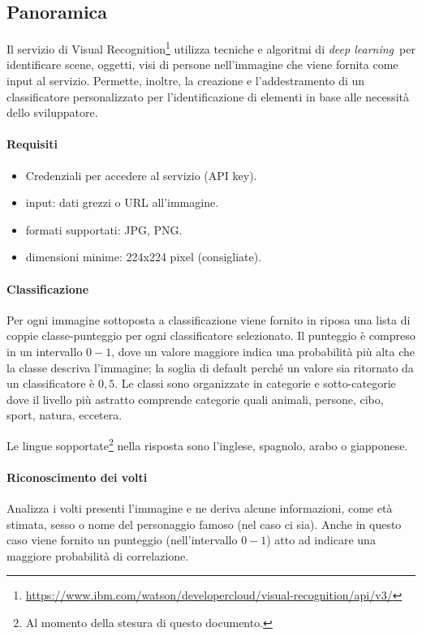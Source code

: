 \documentclass[fleqn,a4paper,11pt]{report}
\begin{document}
\subsection{Panoramica}
Il servizio di Visual Recognition\footnote{\url{https://www.ibm.com/watson/developercloud/visual-recognition/api/v3/}} utilizza tecniche e algoritmi di \textit{deep learning} per identificare scene, oggetti, visi di persone nell'immagine che viene fornita come input al servizio. Permette, inoltre, la creazione e l'addestramento di un classificatore personalizzato per l'identificazione di elementi in base alle necessità dello sviluppatore.

\paragraph{Requisiti}
\begin{itemize}
\item Credenziali per accedere al servizio (API key).
\item input: dati grezzi o URL all'immagine.
\item formati supportati: JPG, PNG.
\item dimensioni minime: 224x224 pixel (consigliate).
\end{itemize}

\paragraph{Classificazione} Per ogni immagine sottoposta a classificazione viene fornito in riposa una lista di coppie classe-punteggio per ogni classificatore selezionato. Il punteggio è compreso in un intervallo $0-1$, dove un valore maggiore indica una probabilità più alta che la classe descriva l'immagine; la soglia di default perché un valore sia ritornato da un classificatore è $0,5$.
Le classi sono organizzate in categorie e sotto-categorie dove il livello più astratto comprende categorie quali animali, persone, cibo, sport, natura, eccetera.

Le lingue sopportate\footnote{Al momento della stesura di questo documento.} nella risposta sono l'inglese, spagnolo, arabo o giapponese. 

\paragraph{Riconoscimento dei volti} Analizza i volti presenti l'immagine e ne deriva alcune informazioni, come età stimata, sesso o nome del personaggio famoso (nel caso ci sia). Anche in questo caso viene fornito un punteggio (nell'intervallo $0-1$) atto ad indicare una maggiore probabilità di correlazione.
\end{document}

